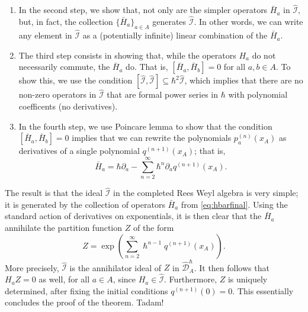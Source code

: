 \documentclass[reqno,oneside,11pt]{amsart}
\theoremstyle{plain}
\theoremstyle{definition}
\theoremstyle{remark}
\numberwithin{equation}{section}
\newcommand{\I}{\mathcal{I}}
\newcommand{\DAhC}{\widehat{\mathcal{D}}_A^{\hbar}}
\begin{document}
\begin{enumerate}
Note that for this process to work, it is very important that we work in the completion $\DAhC$, so that the inductive process can keep going forever.

\item In the second step, we show that, not only are the simpler operators $\bar{H}_a$ in $\widehat{\I}$, but, in fact, the collection $\{ \bar{H}_a \}_{a \in A}$ generates $\widehat{\I}$. In other words, we can write any element in $\widehat{\I}$ as a (potentially infinite) linear combination of the $\bar{H}_a$.

\item The third step consists in showing that, while the operators $H_a$ do not necessarily commute, the $\bar H_a$ do. That is, $[ \bar H_a, \bar H_b ] =0$ for all $a,b \in A$. To show this, we use the condition $[\widehat{\I}, \widehat{\I}] \subseteq \hbar^2 \widehat{\I}$, which implies that there are no non-zero operators in $\widehat{\I}$ that are formal power series in $\hbar$ with polynomial coefficents (no derivatives).

\item In the fourth step, we use Poincare lemma to show that the condition $[\bar{H}_a, \bar{H}_b] = 0$ implies that we can rewrite the polynomials $p_a^{(n)}(x_A)$ as derivatives of a single polynomial $q^{(n+1)}(x_A)$; that is,
\begin{equation}\label{eq:hbarfinal}
\bar{H}_a = \hbar \partial_a -\sum_{n=2}^\infty \hbar^n \partial_a q^{(n+1)}(x_A).
\end{equation}
\end{enumerate}

The result is that the ideal $\widehat{\I}$ in the completed Rees Weyl algebra is very simple; it is generated by the collection of operators $\bar{H}_a$ from \eqref{eq:hbarfinal}. Using the standard action of derivatives on exponentials, it is then clear that the $\bar{H}_a$ annihilate the partition function $Z$ of the form
\begin{equation}\label{eq:pp}
Z = \exp \left(\sum_{n=2}^\infty \hslash^{n-1} q^{(n+1)}(x_A)\right).
\end{equation}
More precisely, $\widehat{\I}$ is the annihilator ideal of $Z$ in $\DAhC$. It then follows that $H_a Z = 0$ as well, for all $a \in A$, since $H_a \in \widehat{\I}$. Furthermore, $Z$ is uniquely determined, after fixing the initial conditions $q^{(n+1)}(0) = 0$.  This essentially concludes the proof of the theorem. Tadam!
\end{document}
